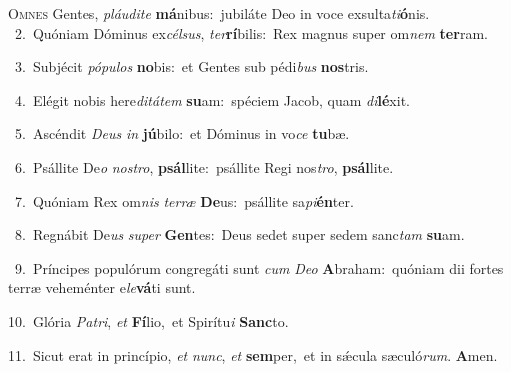 \lettrine{\initial\textcolor{\initialcolor}{O}}{mnes} Gentes, \textit{pláu}\-\textit{di}\textit{te} \textbf{má}\-nibus:~\star jubiláte Deo in voce exsulta\-\textit{ti}\-\textbf{ó}nis.\\
{\numbfont\textcolor{\numbcolor}{~2.}}~Quóniam Dóminus ex\-\textit{cél}\-\textit{sus}, \textit{ter}\-\textbf{rí}bilis:~\star Rex magnus super om\textit{nem} \textbf{ter}\-ram.\par
{\numbfont\textcolor{\numbcolor}{~3.}}~Subjécit \textit{pó}\-\textit{pu}\textit{los} \textbf{no}\-bis:~\star et Gentes sub pédi\textit{bus} \textbf{nos}\-tris.\par
{\numbfont\textcolor{\numbcolor}{~4.}}~Elégit nobis here\-\textit{di}\-\textit{tá}\textit{tem} \textbf{su}\-am:~\star spéciem Jacob, quam \textit{di}\-\textbf{lé}xit.\par
{\numbfont\textcolor{\numbcolor}{~5.}}~Ascéndit \textit{De}\-\textit{us} \textit{in} \textbf{jú}\-bilo:~\star et Dóminus in vo\textit{ce} \textbf{tu}\-bæ.\par
{\numbfont\textcolor{\numbcolor}{~6.}}~Psállite De\textit{o} \textit{nos}\-\textit{tro}, \textbf{psál}\-lite:~\star psállite Regi nos\-\textit{tro}\-, \textbf{psál}\-lite.\par
{\numbfont\textcolor{\numbcolor}{~7.}}~Quóniam Rex om\textit{nis} \textit{ter}\-\textit{ræ} \textbf{De}\-us:~\star psállite sa\-\textit{pi}\-\textbf{én}ter.\par
{\numbfont\textcolor{\numbcolor}{~8.}}~Regnábit De\textit{us} \textit{su}\-\textit{per} \textbf{Gen}\-tes:~\star Deus sedet super sedem sanc\textit{tam} \textbf{su}\-am.\par
{\numbfont\textcolor{\numbcolor}{~9.}}~Príncipes populórum congregáti sunt \textit{cum} \textit{De}\-\textit{o} \textbf{A}\-braham:~\star quóniam dii fortes terræ veheménter e\-\textit{le}\-\textbf{vá}ti sunt.\par
{\numbfont\textcolor{\numbcolor}{10.}}~Glória \textit{Pa}\-\textit{tri}, \textit{et} \textbf{Fí}\-lio,~\star et Spirítu\textit{i} \textbf{Sanc}\-to.\par
{\numbfont\textcolor{\numbcolor}{11.}}~Sicut erat in princípio, \textit{et} \textit{nunc}\-, \textit{et} \textbf{sem}\-per,~\star et in sǽcula sæculó\-\textit{rum}\-. \textbf{A}\-men.\par
